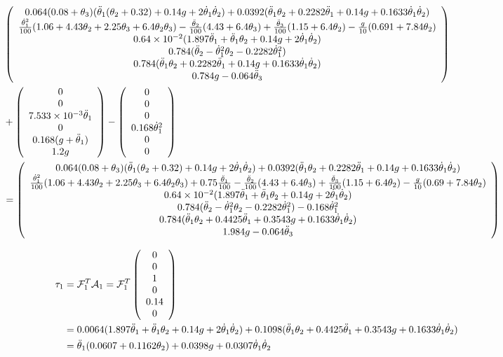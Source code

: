 \documentclass[]{scrreprt}
\newcommand{\myvec}[1]{\left(\begin{array}{c}#1\end{array}\right)}
\begin{document}
\begin{align*}
\\
&
\myvec{0.064(0.08+\theta_3)(\tddot{1}(\theta_2+0.32)+0.14g+2\tdot{1}\tdot{2}) +	0.0392(\tddot{1}\theta_2+0.2282\tddot{1}+0.14g+0.1633\tdot{1}\tdot{2}) \\
	\frac{\tdot{1}^2}{100}(1.06+4.43\theta_2+2.25\theta_3+6.4\theta_2\theta_3)
	-\frac{\tddot{2}}{100}(4.43+6.4\theta_3)
	+\frac{\tddot{3}}{100}(1.15+6.4\theta_2)
	-\frac{g}{10}(0.691+7.84\theta_2)
	\\	
	\num{0.64e-2}(1.897\tddot{1}+\tddot{1}\theta_2+0.14g+2\tdot{1}\tdot{2})\\
	0.784(\tddot{2}-\tdot{1}^2\theta_2-0.2282\tdot{1}^2)\\
	0.784(\tddot{1}\theta_2+0.2282\tddot{1}+0.14g+0.1633\tdot{1}\tdot{2})\\
	0.784g-0.064\tddot{3}}\\
&+
\myvec{0\\
	0\\
	\num{+7.533e-3}\ddot{\theta}_1\\
	0\\
	0.168(g+\ddot{\theta}_1)\\
	1.2g}
-\myvec{0\\0\\0\\0.168\tdot{1}^2\\0\\0}\\
&=
\myvec{0.064(0.08+\theta_3)(\tddot{1}(\theta_2+0.32)+0.14g+2\tdot{1}\tdot{2}) +	0.0392(\tddot{1}\theta_2+0.2282\tddot{1}+0.14g+0.1633\tdot{1}\tdot{2}) \\
	\frac{\tdot{1}^2}{100}(1.06+4.43\theta_2+2.25\theta_3+6.4\theta_2\theta_3)
	+0.75\frac{\ddot{\theta}_1}{100}
	-\frac{\tddot{2}}{100}(4.43+6.4\theta_3)
	+\frac{\tddot{3}}{100}(1.15+6.4\theta_2)
	-\frac{g}{10}(0.69+7.84\theta_2)
	\\	
	\num{0.64e-2}(1.897\tddot{1}+\tddot{1}\theta_2+0.14g+2\tdot{1}\tdot{2})\\
	0.784(\tddot{2}-\tdot{1}^2\theta_2-0.2282\tdot{1}^2)-0.168\tdot{1}^2\\
	0.784(\tddot{1}\theta_2+0.4425\tddot{1}+0.3543g+0.1633\tdot{1}\tdot{2})\\
	1.984g-0.064\tddot{3}}\\
\end{align*}

\begin{align*}
\tau_1 &= \mathcal{F}_1^T\mathcal{A}_1 = \mathcal{F}_1^T\myvec{0\\0\\1\\0\\0.14\\0}\\
&= 0.0064(1.897\tddot{1}+\tddot{1}\theta_2+0.14g+2\tdot{1}\tdot{2})+0.1098(\tddot{1}\theta_2+0.4425\tddot{1}+0.3543g+0.1633\tdot{1}\tdot{2})\\
&= \tddot{1}(0.0607+0.1162\theta_2)+0.0398g+0.0307\tdot{1}\tdot{2}
\end{align*}
\end{document}
